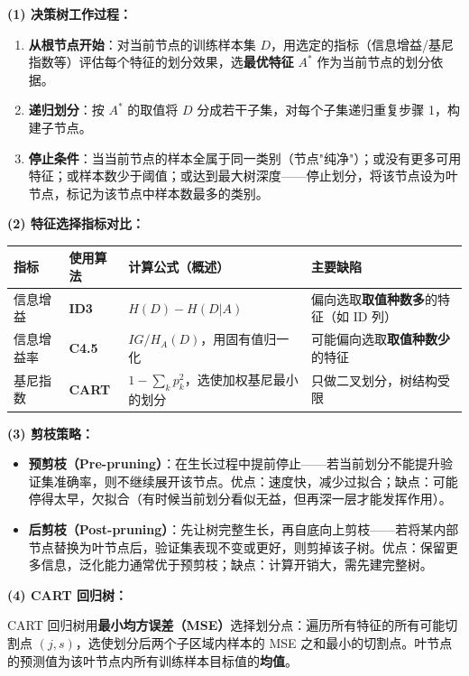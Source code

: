\documentclass[a4paper,11pt]{ctexart}
\begin{document}
\begin{solutionbox}[参考答案与详细解析]
    \textbf{(1) 决策树工作过程：}

    \begin{enumerate}
        \item \textbf{从根节点开始}：对当前节点的训练样本集 $D$，用选定的指标（信息增益/基尼指数等）评估每个特征的划分效果，选\textbf{最优特征} $A^*$ 作为当前节点的划分依据。
        \item \textbf{递归划分}：按 $A^*$ 的取值将 $D$ 分成若干子集，对每个子集递归重复步骤 1，构建子节点。
        \item \textbf{停止条件}：当当前节点的样本全属于同一类别（节点"纯净"）；或没有更多可用特征；或样本数少于阈值；或达到最大树深度——停止划分，将该节点设为叶节点，标记为该节点中样本数最多的类别。
    \end{enumerate}

    \textbf{(2) 特征选择指标对比：}

    \begin{center}
    \begin{tabular}{p{2.8cm} p{2.8cm} p{3.5cm} p{3.5cm}}
        \toprule
        指标 & 使用算法 & 计算公式（概述） & 主要缺陷 \\
        \midrule
        信息增益 & \textbf{ID3} & $H(D) - H(D|A)$ & 偏向选取\textbf{取值种数多}的特征（如 ID 列） \\[1em]
        信息增益率 & \textbf{C4.5} & $IG / H_A(D)$，用固有值归一化 & 可能偏向选取\textbf{取值种数少}的特征 \\[1em]
        基尼指数 & \textbf{CART} & $1 - \sum_k p_k^2$，选使加权基尼最小的划分 & 只做二叉划分，树结构受限 \\
        \bottomrule
    \end{tabular}
    \end{center}

    \textbf{(3) 剪枝策略：}

    \begin{keybox}
        \begin{itemize}
            \item \textbf{预剪枝（Pre-pruning）}：在生长过程中提前停止——若当前划分不能提升验证集准确率，则不继续展开该节点。优点：速度快，减少过拟合；缺点：可能停得太早，欠拟合（有时候当前划分看似无益，但再深一层才能发挥作用）。
            \item \textbf{后剪枝（Post-pruning）}：先让树完整生长，再自底向上剪枝——若将某内部节点替换为叶节点后，验证集表现不变或更好，则剪掉该子树。优点：保留更多信息，泛化能力通常优于预剪枝；缺点：计算开销大，需先建完整树。
        \end{itemize}
    \end{keybox}

    \textbf{(4) CART 回归树：}

    CART 回归树用\textbf{最小均方误差（MSE）}选择划分点：遍历所有特征的所有可能切割点 $(j, s)$，选使划分后两个子区域内样本的 MSE 之和最小的切割点。叶节点的预测值为该叶节点内所有训练样本目标值的\textbf{均值}。
\end{solutionbox}
\end{document}
